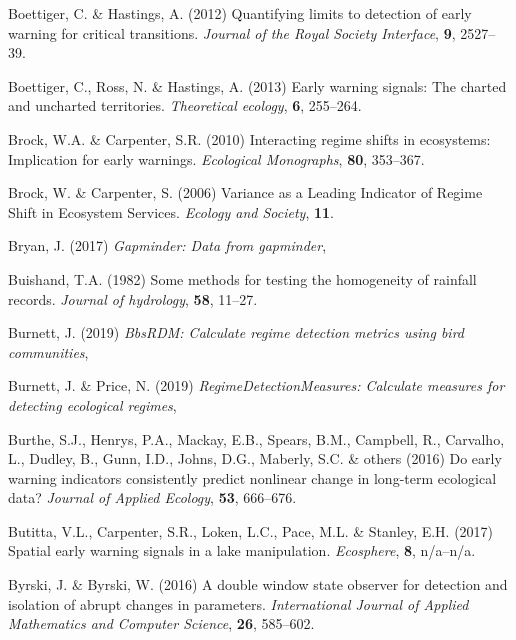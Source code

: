 \documentclass[12pt,twoside,openany]{reedthesis}
\begin{document}
\leavevmode\hypertarget{ref-boettiger_quantifying_2012}{}%
Boettiger, C. \& Hastings, A. (2012) Quantifying limits to detection of early warning for critical transitions. \emph{Journal of the Royal Society Interface}, \textbf{9}, 2527--39.

\leavevmode\hypertarget{ref-boettiger_early_2013}{}%
Boettiger, C., Ross, N. \& Hastings, A. (2013) Early warning signals: The charted and uncharted territories. \emph{Theoretical ecology}, \textbf{6}, 255--264.

\leavevmode\hypertarget{ref-brock2010interacting}{}%
Brock, W.A. \& Carpenter, S.R. (2010) Interacting regime shifts in ecosystems: Implication for early warnings. \emph{Ecological Monographs}, \textbf{80}, 353--367.

\leavevmode\hypertarget{ref-brock_variance_2006}{}%
Brock, W. \& Carpenter, S. (2006) Variance as a Leading Indicator of Regime Shift in Ecosystem Services. \emph{Ecology and Society}, \textbf{11}.

\leavevmode\hypertarget{ref-gapminder}{}%
Bryan, J. (2017) \emph{Gapminder: Data from gapminder},

\leavevmode\hypertarget{ref-buishand1982some}{}%
Buishand, T.A. (1982) Some methods for testing the homogeneity of rainfall records. \emph{Journal of hydrology}, \textbf{58}, 11--27.

\leavevmode\hypertarget{ref-bbsRDM}{}%
Burnett, J. (2019) \emph{BbsRDM: Calculate regime detection metrics using bird communities},

\leavevmode\hypertarget{ref-regimeDetectionMeasures}{}%
Burnett, J. \& Price, N. (2019) \emph{RegimeDetectionMeasures: Calculate measures for detecting ecological regimes},

\leavevmode\hypertarget{ref-burthe2016early}{}%
Burthe, S.J., Henrys, P.A., Mackay, E.B., Spears, B.M., Campbell, R., Carvalho, L., Dudley, B., Gunn, I.D., Johns, D.G., Maberly, S.C. \& others (2016) Do early warning indicators consistently predict nonlinear change in long-term ecological data? \emph{Journal of Applied Ecology}, \textbf{53}, 666--676.

\leavevmode\hypertarget{ref-butitta_spatial_2017}{}%
Butitta, V.L., Carpenter, S.R., Loken, L.C., Pace, M.L. \& Stanley, E.H. (2017) Spatial early warning signals in a lake manipulation. \emph{Ecosphere}, \textbf{8}, n/a--n/a.

\leavevmode\hypertarget{ref-byrski2016double}{}%
Byrski, J. \& Byrski, W. (2016) A double window state observer for detection and isolation of abrupt changes in parameters. \emph{International Journal of Applied Mathematics and Computer Science}, \textbf{26}, 585--602.
\end{document}
